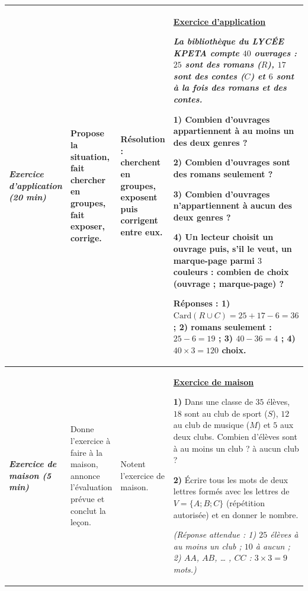 \documentclass[10pt]{article}
\newcommand{\titreR}[1]{\underline{\textcolor{rougetitre}{\bfseries #1}}}
\newcommand{\app}{\titreR{Exercice d'application}}
\newcommand{\maison}{\underline{\textcolor{rougemaison}{\bfseries Exercice de maison}}}
\newcommand{\moment}[1]{\textbf{\itshape #1}}
\begin{document}
\begin{longtable}{|p{2.35cm}|p{5.35cm}|p{4.55cm}|p{13.85cm}|}
\moment{Exercice d'application (20 min)} &
Propose la situation, fait chercher en groupes, fait exposer, corrige. &
\textbf{Résolution} : cherchent en groupes, exposent puis corrigent entre eux. &
\app \par
\textit{La bibliothèque du LYCÉE KPETA compte $40$ ouvrages : $25$ sont des romans
($R$), $17$ sont des contes ($C$) et $6$ sont à la fois des romans et des contes.}
\par
\textbf{1)} Combien d'ouvrages appartiennent à au moins un des deux genres ? \par
\textbf{2)} Combien d'ouvrages sont des romans seulement ? \par
\textbf{3)} Combien d'ouvrages n'appartiennent à aucun des deux genres ? \par
\textbf{4)} Un lecteur choisit un ouvrage puis, s'il le veut, un marque-page parmi $3$
couleurs : combien de choix (ouvrage ; marque-page) ? \par
\textbf{Réponses :} \textbf{1)} $\mathrm{Card}(R\cup C)=25+17-6=36$ ; \;
\textbf{2)} romans seulement : $25-6=19$ ; \; \textbf{3)} $40-36=4$ ; \;
\textbf{4)} $40\times3=120$ choix. \\ \hline

\moment{Exercice de maison (5 min)} &
Donne l'exercice à faire à la maison, annonce l'évaluation prévue et conclut la leçon. &
Notent l'exercice de maison. &
\maison \par
\textbf{1)} Dans une classe de $35$ élèves, $18$ sont au club de sport ($S$), $12$ au
club de musique ($M$) et $5$ aux deux clubs. Combien d'élèves sont à au moins un club ?
à aucun club ? \par
\textbf{2)} Écrire tous les mots de deux lettres formés avec les lettres de
$V=\{A;B;C\}$ (répétition autorisée) et en donner le nombre. \par
\textit{(Réponse attendue : 1) $25$ élèves à au moins un club ; $10$ à aucun ;
2) $AA$, $AB$, … , $CC$ : $3\times3=9$ mots.)} \\ \hline
\end{longtable}
\end{document}
